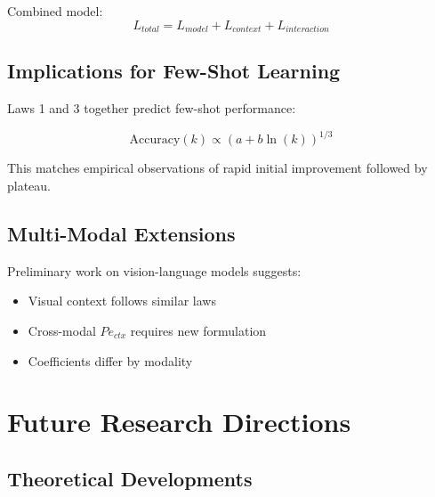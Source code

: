 \documentclass[conference]{IEEEtran}
\begin{document}
Combined model:
\begin{equation}
L_{total} = L_{model} + L_{context} + L_{interaction}
\end{equation}

\subsection{Implications for Few-Shot Learning}

Laws 1 and 3 together predict few-shot performance:

\begin{equation}
\text{Accuracy}(k) \propto (a + b\ln(k))^{1/3}
\end{equation}

This matches empirical observations of rapid initial improvement followed by plateau.

\subsection{Multi-Modal Extensions}

Preliminary work on vision-language models suggests:
\begin{itemize}
\item Visual context follows similar laws
\item Cross-modal $Pe_{ctx}$ requires new formulation
\item Coefficients differ by modality
\end{itemize}

\section{Future Research Directions}

\subsection{Theoretical Developments}
\end{document}
